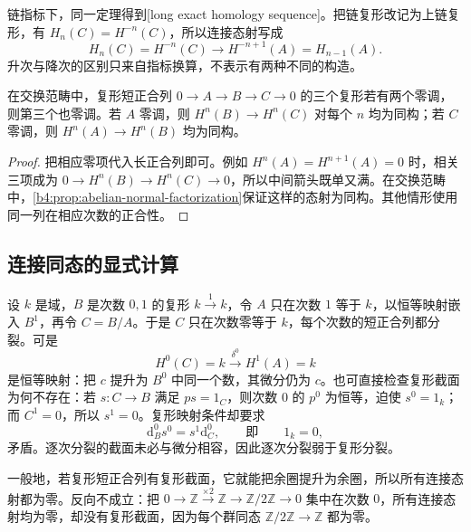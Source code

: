 链指标下，同一定理得到[long exact homology sequence]。把链复形改记为上链复形，有 \(H_n(C)=H^{-n}(C)\)，所以连接态射写成
\[
	H_n(C)=H^{-n}(C)\longrightarrow H^{-n+1}(A)=H_{n-1}(A).
\]
升次与降次的区别只来自指标换算，不表示有两种不同的构造。

\begin{corollary}\label{b4:cor:acyclic-two-of-three}
	在交换范畴中，复形短正合列 \(0\to A\to B\to C\to0\) 的三个复形若有两个零调，则第三个也零调。若 \(A\) 零调，则 \(H^n(B)\to H^n(C)\) 对每个 \(n\) 均为同构；若 \(C\) 零调，则 \(H^n(A)\to H^n(B)\) 均为同构。
\end{corollary}
\begin{proof}
	把相应零项代入长正合列即可。例如 \(H^n(A)=H^{n+1}(A)=0\) 时，相关三项成为 \(0\to H^n(B)\to H^n(C)\to0\)，所以中间箭头既单又满。在交换范畴中，\cref{b4:prop:abelian-normal-factorization}保证这样的态射为同构。其他情形使用同一列在相应次数的正合性。
\end{proof}

\subsection{连接同态的显式计算}
\label{b4:subsec:0503:03}

\begin{example}\label{b4:exm:connecting-nonzero}
	设 \(k\) 是域，\(B\) 是次数 \(0,1\) 的复形 \(k\xrightarrow{1}k\)，令 \(A\) 只在次数 \(1\) 等于 \(k\)，以恒等映射嵌入 \(B^1\)，再令 \(C=B/A\)。于是 \(C\) 只在次数零等于 \(k\)，每个次数的短正合列都分裂。可是
	\[
		H^0(C)=k\xrightarrow{\delta^0}H^1(A)=k
	\]
	是恒等映射：把 \(c\) 提升为 \(B^0\) 中同一个数，其微分仍为 \(c\)。也可直接检查复形截面为何不存在：若 \(s:C\to B\) 满足 \(ps=1_C\)，则次数 \(0\) 的 \(p^0\) 为恒等，迫使 \(s^0=1_k\)；而 \(C^1=0\)，所以 \(s^1=0\)。复形映射条件却要求
	\[
		\mathrm{d}_B^0s^0=s^1\mathrm{d}_C^0, \qquad\text{即}\qquad 1_k=0,
	\]
	矛盾。逐次分裂的截面未必与微分相容，因此逐次分裂弱于复形分裂。

	一般地，若复形短正合列有复形截面，它就能把余圈提升为余圈，所以所有连接态射都为零。反向不成立：把 \(0\to\mathbb Z\xrightarrow{\times2}\mathbb Z\to\mathbb Z/2\mathbb Z\to0\) 集中在次数 \(0\)，所有连接态射均为零，却没有复形截面，因为每个群同态 \(\mathbb Z/2\mathbb Z\to\mathbb Z\) 都为零。
\end{example}

